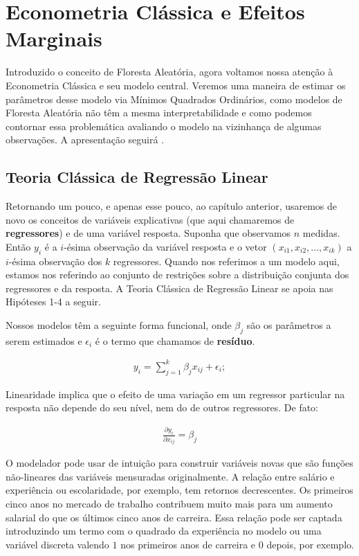 
\chapter{Econometria Clássica e Efeitos Marginais}

Introduzido o conceito de Floresta Aleatória, agora voltamos nossa atenção à Econometria Clássica e seu  modelo central. Veremos uma maneira de estimar os parâmetros desse modelo via Mínimos Quadrados Ordinários, como modelos de Floresta Aleatória não têm a mesma interpretabilidade e como podemos contornar essa problemática avaliando o modelo na vizinhança de algumas observações. A apresentação seguirá . 



\section{Teoria Clássica de Regressão Linear}

Retornando um pouco, e apenas esse pouco, ao capítulo anterior, usaremos de novo os conceitos de variáveis explicativas (que aqui chamaremos de \textbf{regressores}) e de uma variável resposta. Suponha que observamos $n$ medidas. Então $y_i$ é a $i$-ésima observação da variável resposta e o vetor $(x_{i1}, x_{i2}, ..., x_{ik})$ a $i$-ésima observação dos $k$ regressores. Quando nos referimos a um modelo aqui, estamos nos referindo ao conjunto de restrições sobre a distribuição conjunta dos regressores e da resposta. A Teoria Clássica de Regressão Linear se apoia nas Hipóteses 1-4 a seguir.

\begin{hipotese}[Linearidade]
Nossos modelos têm a seguinte forma funcional, onde $\beta_j$ são os parâmetros a serem estimados e $\epsilon_i$ é o termo que chamamos de \textbf{resíduo}. 


\begin{align}
    y_i = \sum_{j = 1}^k \beta_j x_{ij} + \epsilon_i \label{mod_lin};
\end{align}

Linearidade implica que o efeito de uma variação em um regressor particular na resposta não depende do seu nível, nem do de outros regressores. De fato:

\begin{align}
    \frac{\partial y_i}{\partial x_{ij}} = \beta_j
\end{align}
\end{hipotese}


O modelador pode usar de intuição para construir variáveis novas que são funções não-lineares das variáveis mensuradas originalmente. A relação entre salário e experiência ou escolaridade, por exemplo, tem retornos decrescentes. Os primeiros cinco anos no mercado de trabalho contribuem muito mais para um aumento salarial do que os últimos cinco anos de carreira. Essa relação pode ser captada introduzindo um termo com o quadrado da experiência no modelo ou uma variável discreta valendo $1$ nos primeiros anos de carreira e $0$ depois, por exemplo. 



